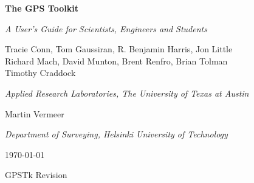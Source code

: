 
\begin{titlepage}

\begin{center}

\addvspace{30pt}


{ \Huge\bf The GPS Toolkit }

\addvspace{10pt}

{ \huge\it A User's Guide for Scientists, Engineers and Students }

\addvspace{60pt}

Tracie Conn, Tom Gaussiran, R. Benjamin Harris, Jon Little \\
Richard Mach, David Munton, Brent Renfro, Brian Tolman \\
Timothy Craddock

\addvspace{3pt}
{ \it Applied Research Laboratories, The University of Texas at Austin}

\addvspace{10pt}

Martin Vermeer

\addvspace{3pt}
{ \it Department of Surveying, Helsinki University of Technology}

\addvspace{60pt}

\today



GPSTk Revision 

\end {center}

\end{titlepage}

